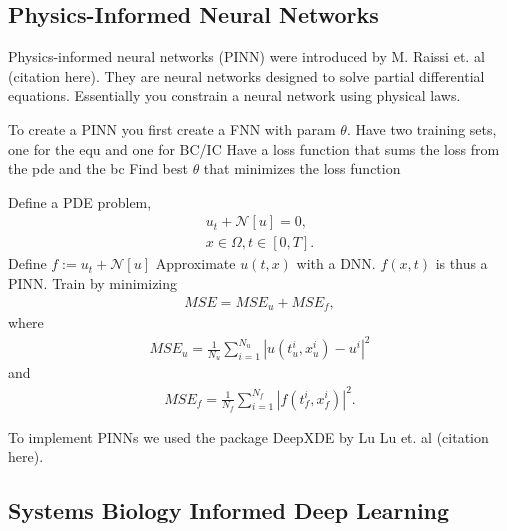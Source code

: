 %
%



\subsection{Physics-Informed Neural Networks}

Physics-informed neural networks (PINN) were introduced by M. Raissi et. al (citation here). 
They are neural networks designed to solve partial differential equations. 
Essentially you constrain a neural network using physical laws.

To create a PINN you first create a FNN with param $\theta$.
Have two training sets, one for the equ and one for BC/IC
Have a loss function that sums the loss from the pde and the bc
Find best $\theta$ that minimizes the loss function

Define a PDE problem, 
\begin{align}
	u_{t}+\mathcal{N}[u]=0, \\
	x \in \Omega, 
	t \in[0, T].
\end{align}
Define $f:=u_{t}+\mathcal{N}[u]$
Approximate $u(t,x)$ with a DNN.
$f(x,t)$ is thus a PINN. 
Train by minimizing 
\begin{align}
	M S E=M S E_{u}+M S E_{f},
\end{align} 
where 
\begin{align}
	M S E_{u}=\frac{1}{N_{u}} \sum_{i=1}^{N_{u}}\left|u\left(t_{u}^{i}, x_{u}^{i}\right)-u^{i}\right|^{2}
\end{align} 
and 
\begin{align}
	M S E_{f}=\frac{1}{N_{f}} \sum_{i=1}^{N_{f}}\left|f\left(t_{f}^{i}, x_{f}^{i}\right)\right|^{2}.
\end{align}

To implement PINNs we used the package DeepXDE by Lu Lu et. al (citation here). 








\subsection{Systems Biology Informed Deep Learning}

